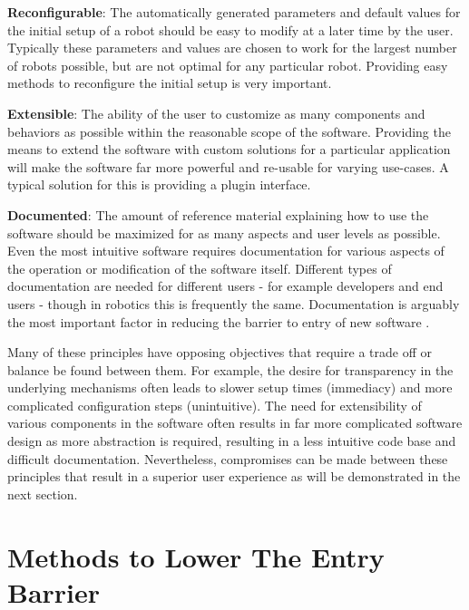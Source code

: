 \documentclass[10pt,journal,compsoc]{joser1}
\begin{document}
{{\bf Reconfigurable}: The automatically generated parameters and default values for the initial setup of a robot should be easy to modify at a later time by the user. Typically these parameters and values are chosen to work for the largest number of robots possible, but are not optimal for any particular robot. Providing easy methods to reconfigure the initial setup is very important. 

{\bf Extensible}: The ability of the user to customize as many components and behaviors as possible within the reasonable scope of the software. Providing the means to extend the software with custom solutions for a particular application will make the software far more powerful and re-usable for varying use-cases. A typical solution for this is providing a plugin interface.

{\bf Documented}: The amount of reference material explaining how to use the software should be maximized for as many aspects and user levels as possible. Even the most intuitive software requires documentation for various aspects of the operation or modification of the software itself. Different types of documentation are needed for different users - for example developers and end users - though in robotics this is frequently the same. Documentation is arguably the most important factor in reducing the barrier to entry of new software \cite{forward2002relevance}.

Many of these principles have opposing objectives that require a trade off or balance be found between them. For example, the desire for transparency in the underlying mechanisms often leads to slower setup times (immediacy) and more complicated configuration steps (unintuitive). The need for extensibility of various components in the software often results in far more complicated software design as more abstraction is required, resulting in a less intuitive code base and difficult documentation. Nevertheless, compromises can be made between these principles that result in a superior user experience as will be demonstrated in the next section.

\section{Methods to Lower The Entry Barrier}
\label{sec::lowering_barriers}

}
\end{document}
